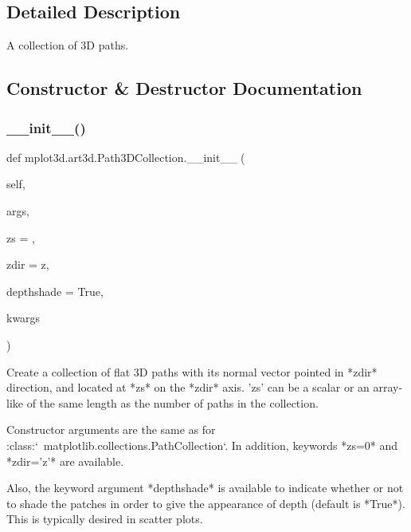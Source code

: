 \subsection{Detailed Description}
\begin{DoxyVerb}A collection of 3D paths.
\end{DoxyVerb}
 

\subsection{Constructor \& Destructor Documentation}
\mbox{\label{classmplot3d_1_1art3d_1_1Path3DCollection_aa4d8e52e853cb9ab90a3379433a2f08d}} 
\subsubsection{\texorpdfstring{\+\_\+\+\_\+init\+\_\+\+\_\+()}{\_\_init\_\_()}}
{\footnotesize\ttfamily def mplot3d.\+art3d.\+Path3\+D\+Collection.\+\_\+\+\_\+init\+\_\+\+\_\+ (\begin{DoxyParamCaption}\item[{}]{self,  }\item[{}]{args,  }\item[{}]{zs = {},  }\item[{}]{zdir = {\ttfamily \textquotesingle{}z\textquotesingle{}},  }\item[{}]{depthshade = {\ttfamily True},  }\item[{}]{kwargs }\end{DoxyParamCaption})}

\begin{DoxyVerb}Create a collection of flat 3D paths with its normal vector
pointed in *zdir* direction, and located at *zs* on the *zdir*
axis. 'zs' can be a scalar or an array-like of the same length as
the number of paths in the collection.

Constructor arguments are the same as for
:class:`~matplotlib.collections.PathCollection`. In addition,
keywords *zs=0* and *zdir='z'* are available.

Also, the keyword argument *depthshade* is available to
indicate whether or not to shade the patches in order to
give the appearance of depth (default is *True*).
This is typically desired in scatter plots.
\end{DoxyVerb}
 

